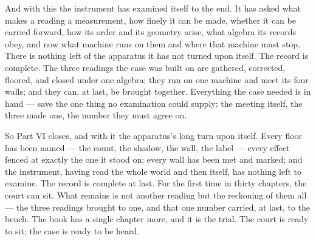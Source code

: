And with this the instrument has examined itself to the end. It has asked what makes a reading a measurement,
how finely it can be made, whether it can be carried forward, how its order and its geometry arise, what algebra
its records obey, and now what machine runs on them and where that machine must stop. There is nothing left of
the apparatus it has not turned upon itself. The record is complete. The three readings the case was built on
are gathered, corrected, floored, and closed under one algebra; they run on one machine and meet its four walls;
and they can, at last, be brought together. Everything the case needed is in hand --- save the one thing no
examination could supply: the meeting itself, the three made one, the number they must agree on.

So Part VI closes, and with it the apparatus's long turn upon itself. Every floor has been named --- the count,
the shadow, the wall, the label --- every effect fenced at exactly the one it stood on; every wall has been met
and marked; and the instrument, having read the whole world and then itself, has nothing left to examine. The
record is complete at last. For the first time in thirty chapters, the court can sit. What remains is not another
reading but the reckoning of them all --- the three readings brought to one, and that one number carried, at
last, to the bench. The book has a single chapter more, and it is the trial. The court is ready to sit; the case
is ready to be heard.

